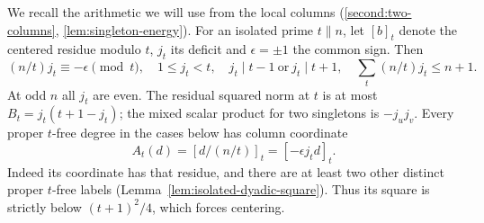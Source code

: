 \documentclass[11pt,a4paper]{article}
\numberwithin{equation}{section}
\theoremstyle{remark}
\begin{document}
We recall the arithmetic we will use from the local columns
(\ref{second:two-columns}, \ref{lem:singleton-energy}). For an
isolated prime $t\parallel n$, let $[b]_t$ denote the centered residue
modulo $t$, $j_t$ its deficit and $\epsilon=\pm1$ the common sign. Then
\begin{equation}\label{short:vacuumcheck}
 (n/t)j_t\equiv-\epsilon\pmod t,\quad 1\le j_t<t,\quad
 j_t\mid t-1\ \text{or}\ j_t\mid t+1,\quad
 \sum_t (n/t)j_t\le n+1 .
\end{equation}
At odd $n$ all $j_t$ are even. The residual squared norm at $t$
is at most $B_t=j_t(t+1-j_t)$; the mixed scalar product for two
singletons is $-j_uj_v$. Every proper $t$-free degree in the cases
below has column coordinate
\[
                     A_t(d)=[d/(n/t)]_t=[-\epsilon j_t d]_t .
\]
Indeed its coordinate has that residue, and there are at least two
other distinct proper $t$-free labels (Lemma~\ref{lem:isolated-dyadic-square}).
Thus its square is strictly below $(t+1)^2/4$, which forces centering.
\end{document}
